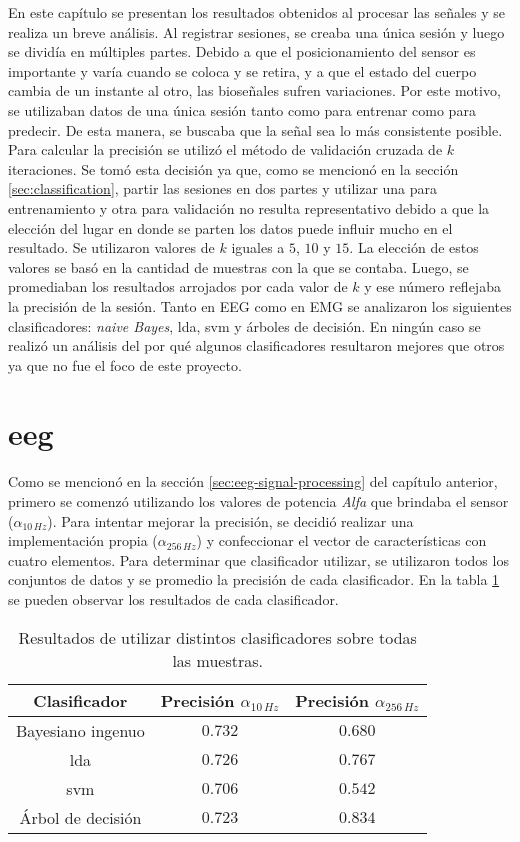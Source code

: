 En este capítulo se presentan los resultados obtenidos al procesar las señales y se realiza un breve análisis. Al registrar sesiones,  se creaba una única sesión y luego se dividía en múltiples partes. Debido a que el posicionamiento del sensor es importante y varía cuando se coloca y se retira,  y a que el estado del cuerpo cambia de un instante al otro, las bioseñales sufren variaciones. Por este motivo, se utilizaban datos de una única sesión tanto como para entrenar como para predecir. De esta manera, se buscaba que la señal sea lo más consistente posible. Para calcular la precisión se utilizó el método de validación cruzada de $k$ iteraciones. Se tomó esta decisión ya que, como se mencionó en la sección \ref{sec:classification}, partir las sesiones en dos partes y utilizar una para entrenamiento y otra para validación no resulta representativo debido a que la elección del lugar en donde se parten los datos puede influir mucho en el resultado. Se utilizaron valores de $k$ iguales a $5$, $10$ y $15$. La elección de estos valores se basó en la cantidad de muestras con la que se contaba. Luego, se promediaban los resultados arrojados por cada valor de $k$ y ese número reflejaba la precisión de la sesión. Tanto en EEG como en EMG se analizaron los siguientes clasificadores: \emph{naive Bayes},  \acrshort{lda}, \gls{svm} y árboles de decisión. En ningún caso se realizó un análisis del por qué algunos clasificadores resultaron mejores que otros ya que no fue el foco de este proyecto.

\section{\acrshort{eeg}}

Como se mencionó en la sección \ref{sec:eeg-signal-processing} del capítulo anterior, primero se comenzó utilizando los valores de potencia \emph{Alfa} que brindaba el sensor ($\alpha_{10 \, Hz}$). Para intentar mejorar la precisión, se decidió realizar una implementación propia ($\alpha_{256 \, Hz}$) y confeccionar el vector de características con cuatro elementos. Para determinar que clasificador utilizar, se utilizaron todos los conjuntos de datos y se promedio la precisión de cada clasificador. En la tabla \ref{tab:eeg-class-result} se pueden observar los resultados de cada clasificador.
 
\begin{table}[H]
\centering
\begin{tabular}{ |c|c|c| } 
 \hline
 Clasificador & Precisión $\alpha_{10 \, Hz}$ &  Precisión $\alpha_{256 \, Hz}$ \\ 
 \hline
 Bayesiano ingenuo & $0.732$  & $0.680$  \\
 \hline
 \gls{lda}  & $0.726$ & $0.767$ \\
  \hline
  \gls{svm} & $0.706$ & $0.542$ \\
  \hline
 Árbol de decisión & $0.723$ & $0.834$ \\
 \hline
\end{tabular}
\caption{Resultados de utilizar distintos clasificadores sobre todas las muestras.}
\label{tab:eeg-class-result}
\end{table}


